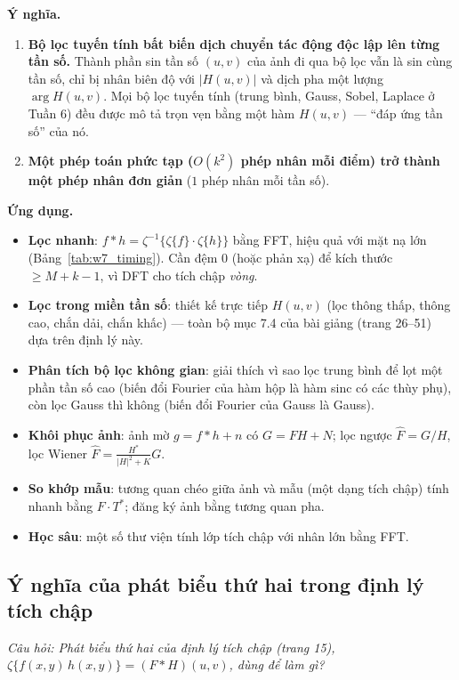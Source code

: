 \textbf{Ý nghĩa.}
\begin{enumerate}
    \item \textbf{Bộ lọc tuyến tính bất biến dịch chuyển tác động độc lập lên từng tần số.} Thành phần sin tần số $(u, v)$ của ảnh đi qua bộ lọc vẫn là sin cùng tần số, chỉ bị nhân biên độ với $|H(u, v)|$ và dịch pha một lượng $\arg H(u, v)$. Mọi bộ lọc tuyến tính (trung bình, Gauss, Sobel, Laplace ở Tuần 6) đều được mô tả trọn vẹn bằng một hàm $H(u, v)$ — ``đáp ứng tần số'' của nó.
    \item \textbf{Một phép toán phức tạp ($O(k^2)$ phép nhân mỗi điểm) trở thành một phép nhân đơn giản} ($1$ phép nhân mỗi tần số).
\end{enumerate}

\textbf{Ứng dụng.}
\begin{itemize}
    \item \textbf{Lọc nhanh}: $f * h = \zeta^{-1}\{\zeta\{f\}\cdot\zeta\{h\}\}$ bằng FFT, hiệu quả với mặt nạ lớn (Bảng~\ref{tab:w7_timing}). Cần đệm $0$ (hoặc phản xạ) để kích thước $\ge M + k - 1$, vì DFT cho tích chập \emph{vòng}.
    \item \textbf{Lọc trong miền tần số}: thiết kế trực tiếp $H(u, v)$ (lọc thông thấp, thông cao, chắn dải, chắn khấc) — toàn bộ mục 7.4 của bài giảng (trang 26--51) dựa trên định lý này.
    \item \textbf{Phân tích bộ lọc không gian}: giải thích vì sao lọc trung bình để lọt một phần tần số cao (biến đổi Fourier của hàm hộp là hàm sinc có các thùy phụ), còn lọc Gauss thì không (biến đổi Fourier của Gauss là Gauss).
    \item \textbf{Khôi phục ảnh}: ảnh mờ $g = f * h + n$ có $G = FH + N$; lọc ngược $\hat F = G/H$, lọc Wiener $\hat F = \frac{H^*}{|H|^2 + K}G$.
    \item \textbf{So khớp mẫu}: tương quan chéo giữa ảnh và mẫu (một dạng tích chập) tính nhanh bằng $F \cdot T^*$; đăng ký ảnh bằng tương quan pha.
    \item \textbf{Học sâu}: một số thư viện tính lớp tích chập với nhân lớn bằng FFT.
\end{itemize}

\subsection{Ý nghĩa của phát biểu thứ hai trong định lý tích chập}
\label{subsec:w7_theorem2}

\textit{Câu hỏi: Phát biểu thứ hai của định lý tích chập (trang 15), $\zeta\{f(x, y)\,h(x, y)\} = (F * H)(u, v)$, dùng để làm gì?}

